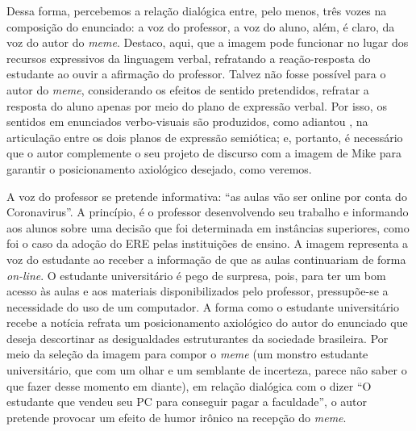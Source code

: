 \documentclass[portuguese]{textolivre}
\begin{document}
Dessa forma, percebemos a relação dialógica entre, pelo menos, três vozes na composição do enunciado: a voz do professor, a voz do aluno, além, é claro, da voz do autor do \textit{meme}. Destaco, aqui, que a imagem pode funcionar no lugar dos recursos expressivos da linguagem verbal, refratando a reação-resposta do estudante ao ouvir a afirmação do professor. Talvez não fosse possível para o autor do \textit{meme}, considerando os efeitos de sentido pretendidos, refratar a resposta do aluno apenas por meio do plano de expressão verbal. Por isso, os sentidos em enunciados verbo-visuais são produzidos, como adiantou \textcite{brait2013olhar}, na articulação entre os dois planos de expressão semiótica; e, portanto, é necessário que o autor complemente o seu projeto de discurso com a imagem de Mike para garantir o posicionamento axiológico desejado, como veremos.
	
A voz do professor se pretende informativa: “as aulas vão ser online por conta do Coronavirus”. A princípio, é o professor desenvolvendo seu trabalho e informando aos alunos sobre uma decisão que foi determinada em instâncias superiores, como foi o caso da adoção do ERE pelas instituições de ensino. A imagem representa a voz do estudante ao receber a informação de que as aulas continuariam de forma \textit{on-line}. O estudante universitário é pego de surpresa, pois, para ter um bom acesso às aulas e aos materiais disponibilizados pelo professor, pressupõe-se a necessidade do uso de um computador. A forma como o estudante universitário recebe a notícia refrata um posicionamento axiológico do autor do enunciado que deseja descortinar as desigualdades estruturantes da sociedade brasileira. Por meio da seleção da imagem para compor o \textit{meme} (um monstro estudante universitário, que com um olhar e um semblante de incerteza, parece não saber o que fazer desse momento em diante), em relação dialógica com o dizer “O estudante que vendeu seu PC para conseguir pagar a faculdade”, o autor pretende provocar um efeito de humor irônico na recepção do \textit{meme}.
	
\end{document}

